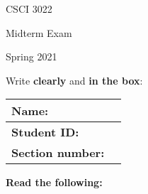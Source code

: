 \documentclass[addpoints]{exam}
\begin{document}
\begin{minipage}[ht!]{.25\textwidth}
CSCI 3022 

Midterm Exam

Spring 2021
\vfill
\end{minipage}
\begin{minipage}[ht]{.75\textwidth}
	\large
	Write \textbf{clearly} and \textbf{in the box}:
	\centering
	\begin{tabular}{|l c|} 	\hline 
	\rule{0pt}{1cm}
	\textbf{Name:} & \hspace{9cm} \\ \hline 
	\rule{0pt}{1cm}
	\textbf{Student ID:} & \hspace{9cm} \\ \hline 
	\rule{0pt}{1cm} \textbf{Section number:} & \hspace{9cm} \\ \hline 
	\end{tabular}
\end{minipage}%

\vspace{1cm}

{\bf Read the following:}
\vspace{1pc}
\end{document}

